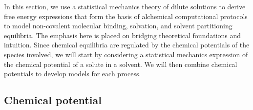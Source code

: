 \documentclass[9pt,bestpractices,pubversion]{livecoms}
\begin{document}
In this section, we use a statistical mechanics theory of dilute solutions to derive free energy expressions that form the basis of alchemical computational protocols to model non-covalent molecular binding, solvation, and solvent partitioning equilibria. The emphasis here is placed on bridging theoretical foundations and intuition. Since chemical equilibria are regulated by the chemical potentials of the species involved, we will start by considering a statistical mechanics expression of the chemical potential of a solute in a solvent. We will then combine chemical potentials to develop models for each process.

\subsection{Chemical potential}
\end{document}
